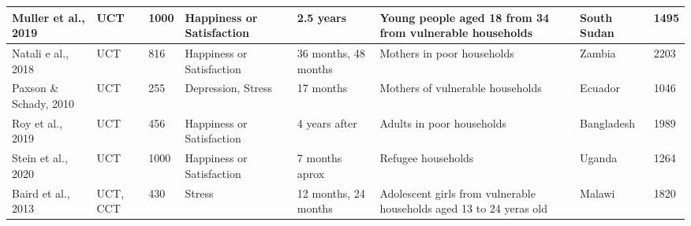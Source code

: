 \begin{longtable}{p{1.8cm}p{1.7cm}p{1.3 cm}p{1.8cm}p{1.7cm}p{2cm}p{1.2cm}p{1cm}}
   \hline
Muller et al., 2019 & UCT & 1000 & Happiness or Satisfaction & 2.5 years & Young people aged 18 from 34  from vulnerable households & South Sudan & 1495 \\ 
   \hline
Natali e al., 2018 & UCT & 816 & Happiness or Satisfaction & 36 months, 48 months & Mothers in poor households & Zambia & 2203 \\ 
   \hline
Paxson \& Schady, 2010 & UCT & 255 & Depression, Stress & 17 months & Mothers of vulnerable households & Ecuador & 1046 \\ 
   \hline
Roy et al., 2019 & UCT & 456 & Happiness or Satisfaction & 4 years after & Adults in poor households & Bangladesh & 1989 \\ 
   \hline
Stein et al., 2020 & UCT & 1000 & Happiness or Satisfaction & 7 months aprox & Refugee households & Uganda & 1264 \\ 
   \hline
Baird et al., 2013 & UCT, CCT & 430 & Stress & 12 months, 24 months & Adolescent girls from vulnerable households aged 13 to 24 yeras old & Malawi & 1820 \\ 
   \hline
\hline
\end{longtable}
\endgroup
